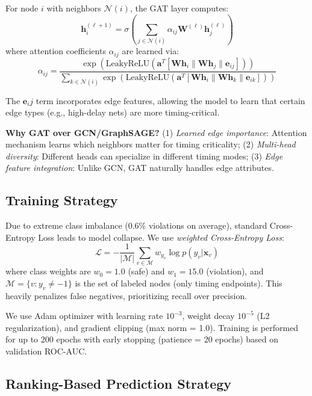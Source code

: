 For node $i$ with neighbors $\mathcal{N}(i)$, the GAT layer computes:
\begin{equation}
\mathbf{h}_i^{(\ell+1)} = \sigma \left( \sum_{j \in \mathcal{N}(i)} \alpha_{ij} \mathbf{W}^{(\ell)} \mathbf{h}_j^{(\ell)} \right)
\label{eq:gat_update}
\end{equation}
where attention coefficients $\alpha_{ij}$ are learned via:
\begin{equation}
\alpha_{ij} = \frac{\exp(\text{LeakyReLU}(\mathbf{a}^T [\mathbf{W}\mathbf{h}_i \| \mathbf{W}\mathbf{h}_j \| \mathbf{e}_{ij}]))}{\sum_{k \in \mathcal{N}(i)} \exp(\text{LeakyReLU}(\mathbf{a}^T [\mathbf{W}\mathbf{h}_i \| \mathbf{W}\mathbf{h}_k \| \mathbf{e}_{ik}]))}
\label{eq:attention}
\end{equation}

The $\mathbf{e}_i$$j$ term incorporates edge features, allowing the model to learn that certain edge types (e.g., high-delay nets) are more timing-critical.

\textbf{Why GAT over GCN/GraphSAGE?}
(1) \textit{Learned edge importance}: Attention mechanism learns which neighbors matter for timing criticality;
(2) \textit{Multi-head diversity}: Different heads can specialize in different timing modes;
(3) \textit{Edge feature integration}: Unlike GCN, GAT naturally handles edge attributes.

\subsection{Training Strategy}

Due to extreme class imbalance (0.6\% violations on average), standard Cross-Entropy Loss leads to model collapse. We use \textit{weighted Cross-Entropy Loss}:
\begin{equation}
\mathcal{L} = -\frac{1}{|\mathcal{M}|} \sum_{v \in \mathcal{M}} w_{y_v} \log p(y_v | \mathbf{x}_v)
\label{eq:loss}
\end{equation}
where class weights are $w_0 = 1.0$ (safe) and $w_1 = 15.0$ (violation), and $\mathcal{M} = \{v : y_v \neq -1\}$ is the set of labeled nodes (only timing endpoints). This heavily penalizes false negatives, prioritizing recall over precision.

We use Adam optimizer with learning rate $10^{-3}$, weight decay $10^{-5}$ (L2 regularization), and gradient clipping (max norm = 1.0). Training is performed for up to 200 epochs with early stopping (patience = 20 epochs) based on validation ROC-AUC.

\subsection{Ranking-Based Prediction Strategy}

